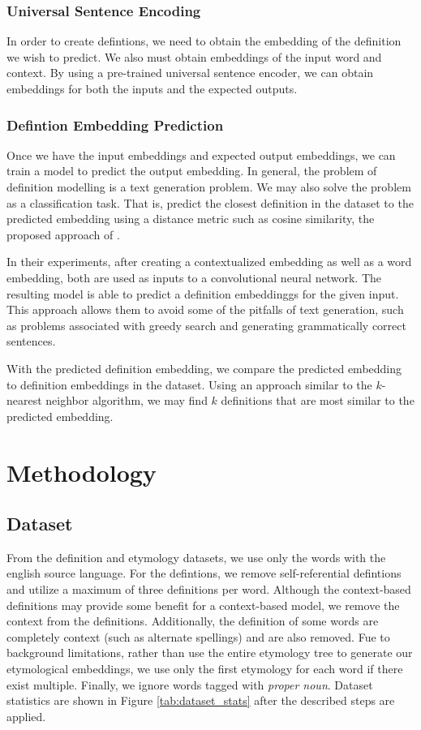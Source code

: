 \documentclass[11pt,a4paper]{article}
\begin{document}
\subsubsection{Universal Sentence Encoding}

In order to create defintions, we need to obtain the embedding of the definition
we wish to predict. We also must obtain embeddings of the input word and
context. By using a pre-trained universal sentence encoder, we can obtain
embeddings for both the inputs and the expected outputs.

\subsubsection{Defintion Embedding Prediction}
Once we have the input embeddings and expected output embeddings, we can train a
model to predict the output embedding. In general, the problem of definition
modelling is a text generation problem. We may also solve the problem as a
classification task. That is, predict the closest definition in the dataset to
the predicted embedding using a distance metric such as cosine similarity, the
proposed approach of \citet{chang_what_2019}.

In their experiments, after creating a contextualized embedding as well as a
word embedding, both are used as inputs to a convolutional neural network. The
resulting model is able to predict a definition embeddinggs for the given input.
This approach allows them to avoid some of the pitfalls of text generation, such
as problems associated with greedy search and generating grammatically correct
sentences.

With the predicted definition embedding, we compare the predicted embedding to
definition embeddings in the dataset. Using an approach similar to the
$k$-nearest neighbor algorithm, we may find $k$ definitions that are most
similar to the predicted embedding.

\section{Methodology}

\subsection{Dataset}

From the definition and etymology datasets, we use only the words with the
english source language. For the defintions, we remove self-referential
defintions and utilize a maximum of three definitions per word. Although the
context-based definitions may provide some benefit for a context-based model, we
remove the context from the definitions. Additionally, the definition of some
words are completely context (such as alternate spellings) and are also removed.
Fue to background limitations, rather than use the entire etymology tree to
generate our etymological embeddings, we use only the first etymology for each
word if there exist multiple. Finally, we ignore words tagged with
\textit{proper noun}. Dataset statistics are shown in Figure
\ref{tab:dataset_stats} after the described steps are applied.
\end{document}
